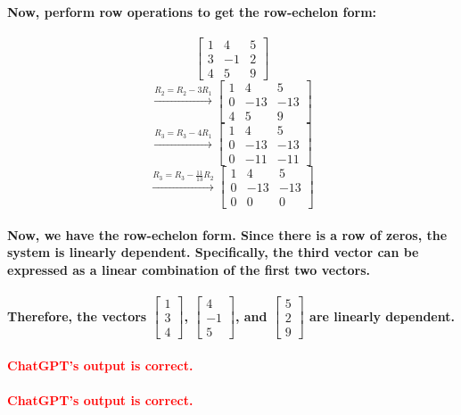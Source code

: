 \documentclass[11pt]{article} %
\begin{document}
\begin{mdframed}
    \paragraph{Now, perform row operations to get the row-echelon form:}
    \[ \begin{bmatrix} 1 & 4 & 5 \\ 3 & -1 & 2 \\ 4 & 5 & 9 \end{bmatrix} \]
    \[ \overset{R_2 = R_2 - 3R_1}{\longrightarrow} \begin{bmatrix} 1 & 4 & 5 \\ 0 & -13 & -13 \\ 4 & 5 & 9 \end{bmatrix} \]
    \[ \overset{R_3 = R_3 - 4R_1}{\longrightarrow} \begin{bmatrix} 1 & 4 & 5 \\ 0 & -13 & -13 \\ 0 & -11 & -11 \end{bmatrix} \]
    \[ \overset{R_3 = R_3 - \frac{11}{13}R_2}{\longrightarrow} \begin{bmatrix} 1 & 4 & 5 \\ 0 & -13 & -13 \\ 0 & 0 & 0 \end{bmatrix} \]
    \paragraph{Now, we have the row-echelon form. Since there is a row of zeros, the system is linearly dependent. Specifically, the third vector can be expressed as a linear combination of the first two vectors.}
    \paragraph{Therefore, the vectors \( \begin{bmatrix} 1 \\ 3 \\ 4 \end{bmatrix} \), \( \begin{bmatrix} 4 \\ -1 \\ 5 \end{bmatrix} \), and \( \begin{bmatrix} 5 \\ 2 \\ 9 \end{bmatrix} \) are linearly dependent.}
    \paragraph{\textcolor{red}{ChatGPT's output is correct.}}
    \paragraph{\textcolor{red}{ChatGPT's output is correct.}}
\end{mdframed}
% 
% 
\end{document}
